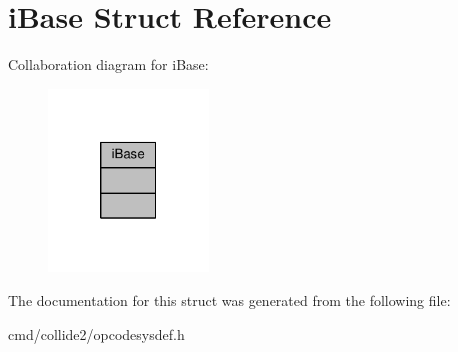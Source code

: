 \hypertarget{structiBase}{}\section{i\+Base Struct Reference}
\label{structiBase}


Collaboration diagram for i\+Base\+:
\nopagebreak
\begin{figure}[H]
\begin{center}
\leavevmode
\includegraphics[width=121pt]{d3/d14/structiBase__coll__graph}
\end{center}
\end{figure}


The documentation for this struct was generated from the following file\+:\begin{DoxyCompactItemize}
\item 
cmd/collide2/opcodesysdef.\+h\end{DoxyCompactItemize}
